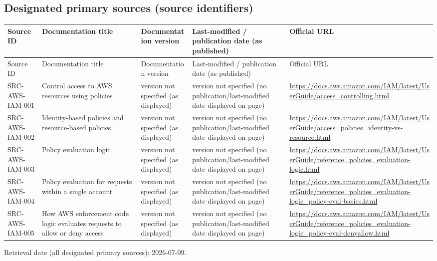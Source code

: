 \documentclass{article}
\begin{document}
\subsection*{Designated primary sources (source identifiers)}
\begin{longtable}{@{}p{}p{}p{}p{}p{}@{}}
\toprule
Source ID & Documentation title & Documentation version & Last-modified / publication date (as published) & Official URL\\
\midrule
\endfirsthead
\toprule
Source ID & Documentation title & Documentation version & Last-modified / publication date (as published) & Official URL\\
\midrule
\endhead
SRC-AWS-IAM-001 & Control access to AWS resources using policies & version not specified (as displayed) & version not specified (no publication/last-modified date displayed on page) & \url{https://docs.aws.amazon.com/IAM/latest/UserGuide/access_controlling.html}\\
SRC-AWS-IAM-002 & Identity-based policies and resource-based policies & version not specified (as displayed) & version not specified (no publication/last-modified date displayed on page) & \url{https://docs.aws.amazon.com/IAM/latest/UserGuide/access_policies_identity-vs-resource.html}\\
SRC-AWS-IAM-003 & Policy evaluation logic & version not specified (as displayed) & version not specified (no publication/last-modified date displayed on page) & \url{https://docs.aws.amazon.com/IAM/latest/UserGuide/reference_policies_evaluation-logic.html}\\
SRC-AWS-IAM-004 & Policy evaluation for requests within a single account & version not specified (as displayed) & version not specified (no publication/last-modified date displayed on page) & \url{https://docs.aws.amazon.com/IAM/latest/UserGuide/reference_policies_evaluation-logic_policy-eval-basics.html}\\
SRC-AWS-IAM-005 & How AWS enforcement code logic evaluates requests to allow or deny access & version not specified (as displayed) & version not specified (no publication/last-modified date displayed on page) & \url{https://docs.aws.amazon.com/IAM/latest/UserGuide/reference_policies_evaluation-logic_policy-eval-denyallow.html}\\
\bottomrule
\end{longtable}
Retrieval date (all designated primary sources): 2026-07-09.
\end{document}
